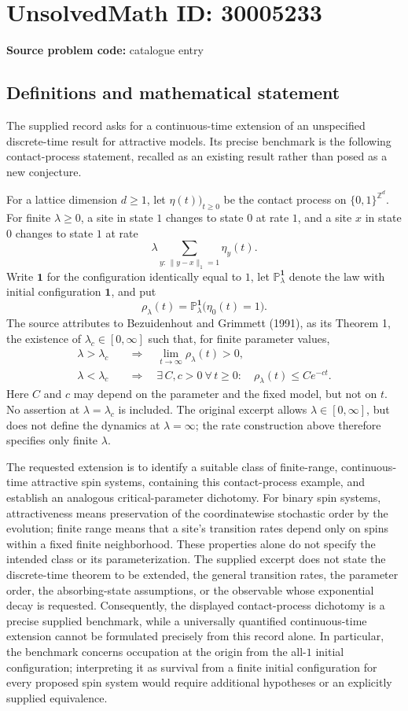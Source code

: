 \documentclass[11pt]{article}
\newcommand{\Z}{\mathbb{Z}}
\begin{document}
\section*{UnsolvedMath ID: 30005233}
\textbf{Source problem code:} catalogue entry
\subsection{Definitions and mathematical statement}
The supplied record asks for a continuous-time extension of an unspecified discrete-time result for attractive models. Its precise benchmark is the following contact-process statement, recalled as an existing result rather than posed as a new conjecture.

For a lattice dimension \(d\geq 1\), let \(\eta(t))_{t\geq 0}\) be the contact process on \(\{0,1\}^{\Z^d}\). For finite \(\lambda\geq 0\), a site in state \(1\) changes to state \(0\) at rate \(1\), and a site \(x\) in state \(0\) changes to state \(1\) at rate
\[
\lambda\sum_{y:\,\|y-x\|_1=1}\eta_y(t).
\]
Write \(\mathbf 1\) for the configuration identically equal to \(1\), let \(\mathbb P^{\mathbf 1}_\lambda\) denote the law with initial configuration \(\mathbf 1\), and put
\[
\rho_\lambda(t)=\mathbb P^{\mathbf 1}_\lambda\bigl(\eta_0(t)=1\bigr).
\]
The source attributes to Bezuidenhout and Grimmett (1991), as its Theorem 1, the existence of \(\lambda_c\in[0,\infty]\) such that, for finite parameter values,
\[
\begin{aligned}
\lambda>\lambda_c
&\quad\Longrightarrow\quad
\lim_{t\to\infty}\rho_\lambda(t)>0,\\
\lambda<\lambda_c
&\quad\Longrightarrow\quad
\exists\,C,c>0\ \forall\,t\geq0:\quad
\rho_\lambda(t)\leq C e^{-ct}.
\end{aligned}
\]
Here \(C\) and \(c\) may depend on the parameter and the fixed model, but not on \(t\). No assertion at \(\lambda=\lambda_c\) is included. The original excerpt allows \(\lambda\in[0,\infty]\), but does not define the dynamics at \(\lambda=\infty\); the rate construction above therefore specifies only finite \(\lambda\).

The requested extension is to identify a suitable class of finite-range, continuous-time attractive spin systems, containing this contact-process example, and establish an analogous critical-parameter dichotomy. For binary spin systems, attractiveness means preservation of the coordinatewise stochastic order by the evolution; finite range means that a site's transition rates depend only on spins within a fixed finite neighborhood. These properties alone do not specify the intended class or its parameterization. The supplied excerpt does not state the discrete-time theorem to be extended, the general transition rates, the parameter order, the absorbing-state assumptions, or the observable whose exponential decay is requested. Consequently, the displayed contact-process dichotomy is a precise supplied benchmark, while a universally quantified continuous-time extension cannot be formulated precisely from this record alone. In particular, the benchmark concerns occupation at the origin from the all-\(1\) initial configuration; interpreting it as survival from a finite initial configuration for every proposed spin system would require additional hypotheses or an explicitly supplied equivalence.
\end{document}

